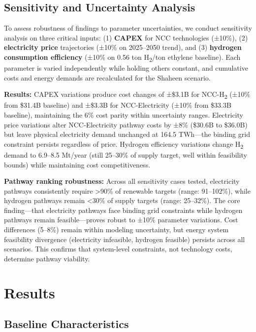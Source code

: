 \documentclass[11pt,a4paper]{article}
\begin{document}
\subsection{Sensitivity and Uncertainty Analysis}

To assess robustness of findings to parameter uncertainties, we conduct sensitivity analysis on three critical inputs: (1) \textbf{CAPEX} for NCC technologies (±10\%), (2) \textbf{electricity price} trajectories (±10\% on 2025--2050 trend), and (3) \textbf{hydrogen consumption efficiency} (±10\% on 0.56 ton H\textsubscript{2}/ton ethylene baseline). Each parameter is varied independently while holding others constant, and cumulative costs and energy demands are recalculated for the Shaheen scenario.

\textbf{Results:} CAPEX variations produce cost changes of ±\$3.1B for NCC-H\textsubscript{2} (±10\% from \$31.4B baseline) and ±\$3.3B for NCC-Electricity (±10\% from \$33.3B baseline), maintaining the 6\% cost parity within uncertainty ranges. Electricity price variations alter NCC-Electricity pathway costs by ±8\% (\$30.6B to \$36.0B) but leave physical electricity demand unchanged at 164.5 TWh---the binding grid constraint persists regardless of price. Hydrogen efficiency variations change H\textsubscript{2} demand to 6.9--8.5 Mt/year (still 25--30\% of supply target, well within feasibility bounds) while maintaining cost competitiveness.

\textbf{Pathway ranking robustness:} Across all sensitivity cases tested, electricity pathways consistently require \textgreater90\% of renewable targets (range: 91--102\%), while hydrogen pathways remain \textless30\% of supply targets (range: 25--32\%). The core finding---that electricity pathways face binding grid constraints while hydrogen pathways remain feasible---proves robust to ±10\% parameter variations. Cost differences (5--8\%) remain within modeling uncertainty, but energy system feasibility divergence (electricity infeasible, hydrogen feasible) persists across all scenarios. This confirms that system-level constraints, not technology costs, determine pathway viability.

\section{Results}
\label{sec:results}

\subsection{Baseline Characteristics}
\end{document}
